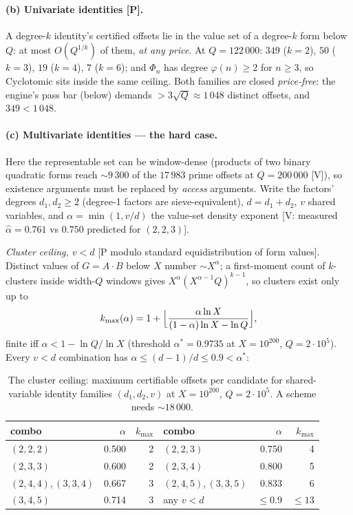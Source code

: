 \paragraph{(b) Univariate identities [P].} A degree-$k$ identity's
certified offsets lie in the value set of a degree-$k$ form below $Q$:
at most $O(Q^{1/k})$ of them, \emph{at any price}. At $Q=122\,000$:
$349$ ($k{=}2$), $50$ ($k{=}3$), $19$ ($k{=}4$), $7$ ($k{=}6$); and
$\Phi_n$ has degree $\varphi(n)\ge2$ for $n\ge3$, so
\textsf{Cyclotomic} sits inside the same ceiling. Both families are
closed \emph{price-free}: the engine's pass bar (below) demands
$>3\sqrt Q\approx1\,048$ distinct offsets, and $349<1\,048$.

\paragraph{(c) Multivariate identities --- the hard case.} Here the
representable set can be window-dense (products of two binary quadratic
forms reach $\sim$$9\,300$ of the $17\,983$ prime offsets at
$Q=200\,000$ [V]), so existence arguments must be replaced by
\emph{access} arguments. Write the factors' degrees $d_1,d_2\ge2$
(degree-1 factors are sieve-equivalent), $d=d_1+d_2$, $v$ shared
variables, and $\alpha=\min(1,v/d)$ the value-set density exponent
[V: measured $\hat\alpha=0.761$ vs $0.750$ predicted for $(2,2,3)$].

\emph{Cluster ceiling, $v<d$} [P modulo standard equidistribution of
form values]. Distinct values of $G=A\cdot B$ below $X$ number
$\sim X^\alpha$; a first-moment count of $k$-clusters inside width-$Q$
windows gives $X^\alpha(X^{\alpha-1}Q)^{k-1}$, so clusters exist only
up to
\[
k_{\max}(\alpha)=1+\Bigl\lfloor\frac{\alpha\ln X}{(1-\alpha)\ln X-\ln Q}\Bigr\rfloor,
\]
finite iff $\alpha<1-\ln Q/\ln X$ (threshold $\alpha^*=0.9735$ at
$X=10^{200}$, $Q=2\cdot10^5$). Every $v<d$ combination has
$\alpha\le(d-1)/d\le0.9<\alpha^*$:

\begin{table}[h]
\centering\small
\caption{The cluster ceiling: maximum certifiable offsets per candidate
for shared-variable identity families $(d_1,d_2,v)$ at $X=10^{200}$,
$Q=2\cdot10^5$. A scheme needs $\sim$$18\,000$.}\label{tab:kmax}
\begin{tabular}{lrr@{\qquad}lrr}
\toprule
combo & $\alpha$ & $k_{\max}$ & combo & $\alpha$ & $k_{\max}$\\
\midrule
$(2,2,2)$ & 0.500 & 2 & $(2,2,3)$ & 0.750 & 4\\
$(2,3,3)$ & 0.600 & 2 & $(2,3,4)$ & 0.800 & 5\\
$(2,4,4),(3,3,4)$ & 0.667 & 3 & $(2,4,5),(3,3,5)$ & 0.833 & 6\\
$(3,4,5)$ & 0.714 & 3 & any $v<d$ & $\le0.9$ & $\le13$\\
\bottomrule
\end{tabular}
\end{table}

